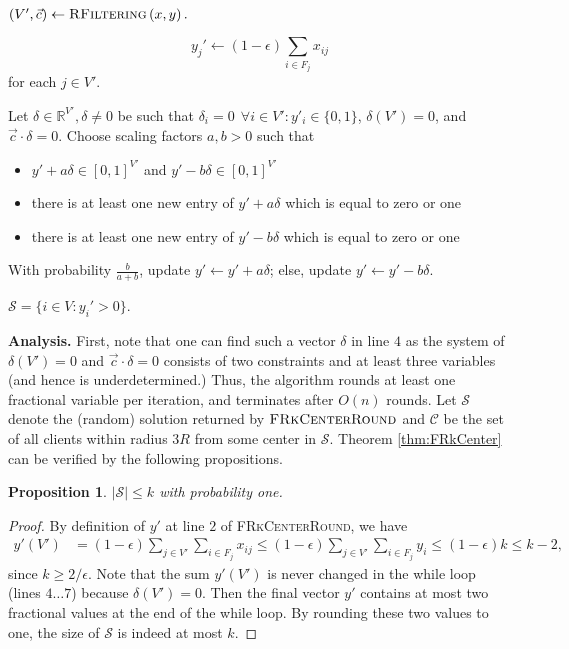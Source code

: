 \documentclass[a4paper,11pt]{article}
\newtheorem{proposition}[theorem]{Proposition}
\newcommand{\C}{\mathcal{C}}
\renewcommand{\S}{\mathcal{S}}
\begin{document}
\begin{algorithm}[h]
\caption{$\textsc{FRkCenterRound}\left(\epsilon,x,y \right)$}
\begin{algorithmic}[1]
\STATE $(V',\vec{c}) \gets \textsc{RFiltering}\left(x,y \right).$

$$
y_j' \gets (1 - \epsilon)\sum_{i \in F_j} x_{ij}
$$
for each $j \in V'$.

	\STATE Let $\delta \in \mathbb{R}^{V'}, \delta \neq 0$ be such that $\delta_i = 0 ~~\forall i \in V':y'_i \in \{0,1\}$,  $\delta(V') = 0$, and $\vec{c} \cdot \delta = 0.$
	\STATE Choose scaling factors $a,b > 0$ such that 
		\begin{itemize}[noitemsep,nolistsep] 
			\item $y'+a\delta\in [0,1]^{V'}$ and $y'-b\delta \in [0,1]^{V'}$
			\item there is at least one new entry of $y'+a\delta$ which is equal to zero or one
			\item there is at least one new entry of $y'-b\delta$ which is equal to zero or one
		\end{itemize}
	\STATE With probability $\frac{b}{a+b}$, update $y' \gets y' + a\delta$; else, update $y' \gets y' - b\delta$.	
\ENDWHILE

\RETURN $\S = \{i \in V: y_i' > 0\}$.
\end{algorithmic} 
\label{algo:frkcenter}
\end{algorithm}

\bigskip \textbf{Analysis.} First, note that one can find such a vector $\delta$ in line $4$ as the system of $\delta(V')=0$ and $\vec{c} \cdot \delta = 0$ consists of two constraints and at least three variables (and hence is underdetermined.) Thus, the algorithm rounds at least one fractional variable per iteration, and terminates after $O(n)$ rounds. Let $\S$ denote the (random) solution returned by  $\textsc{FRkCenterRound}$ and $\C$ be the set of all clients within radius $3R$ from some center in $\S$. Theorem \ref{thm:FRkCenter} can be verified by the following propositions.

\begin{proposition}  $|\S| \leq k$ with probability one.
\end{proposition}
\begin{proof} By definition of $y'$ at line $2$ of \textsc{FRkCenterRound}, we have
\begin{align*}
y'(V') &= (1-\epsilon) \sum_{j \in V'} \sum_{i \in F_j} x_{ij}  \leq (1-\epsilon) \sum_{j \in V'} \sum_{i \in F_j} y_i \leq (1-\epsilon)k \leq k-2,	
\end{align*}
since $k \geq 2/\epsilon$.
Note that the sum $y'(V')$ is never changed in the while loop (lines $4 \ldots 7$) because $\delta(V') = 0$. Then the final vector $y'$ contains at most two fractional values at the end of the while loop. By rounding these two values to one, the size of $\S$ is indeed at most $k$.
\end{proof}
\end{document}
